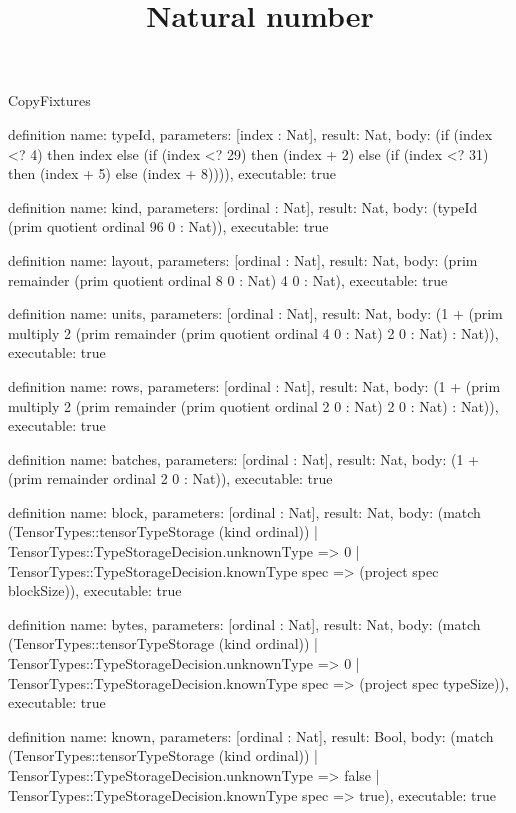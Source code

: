 \begin{lexlean}{CopyFixtures}
\title{Natural number}
\begin{semanticmodule}
definition{
  name: typeId,
  parameters: [index : Nat],
  result: Nat,
  body: (if (index <? 4) then index else (if (index <? 29) then (index + 2) else (if (index <? 31) then (index + 5) else (index + 8)))),
  executable: true
}

definition{
  name: kind,
  parameters: [ordinal : Nat],
  result: Nat,
  body: (typeId (prim quotient ordinal 96 0 : Nat)),
  executable: true
}

definition{
  name: layout,
  parameters: [ordinal : Nat],
  result: Nat,
  body: (prim remainder (prim quotient ordinal 8 0 : Nat) 4 0 : Nat),
  executable: true
}

definition{
  name: units,
  parameters: [ordinal : Nat],
  result: Nat,
  body: (1 + (prim multiply 2 (prim remainder (prim quotient ordinal 4 0 : Nat) 2 0 : Nat) : Nat)),
  executable: true
}

definition{
  name: rows,
  parameters: [ordinal : Nat],
  result: Nat,
  body: (1 + (prim multiply 2 (prim remainder (prim quotient ordinal 2 0 : Nat) 2 0 : Nat) : Nat)),
  executable: true
}

definition{
  name: batches,
  parameters: [ordinal : Nat],
  result: Nat,
  body: (1 + (prim remainder ordinal 2 0 : Nat)),
  executable: true
}

definition{
  name: block,
  parameters: [ordinal : Nat],
  result: Nat,
  body: (match (TensorTypes::tensorTypeStorage (kind ordinal))
    | TensorTypes::TypeStorageDecision.unknownType => 0
    | TensorTypes::TypeStorageDecision.knownType spec => (project spec blockSize)),
  executable: true
}

definition{
  name: bytes,
  parameters: [ordinal : Nat],
  result: Nat,
  body: (match (TensorTypes::tensorTypeStorage (kind ordinal))
    | TensorTypes::TypeStorageDecision.unknownType => 0
    | TensorTypes::TypeStorageDecision.knownType spec => (project spec typeSize)),
  executable: true
}

definition{
  name: known,
  parameters: [ordinal : Nat],
  result: Bool,
  body: (match (TensorTypes::tensorTypeStorage (kind ordinal))
    | TensorTypes::TypeStorageDecision.unknownType => false
    | TensorTypes::TypeStorageDecision.knownType spec => true),
  executable: true
}


\end{semanticmodule}
\end{lexlean}
